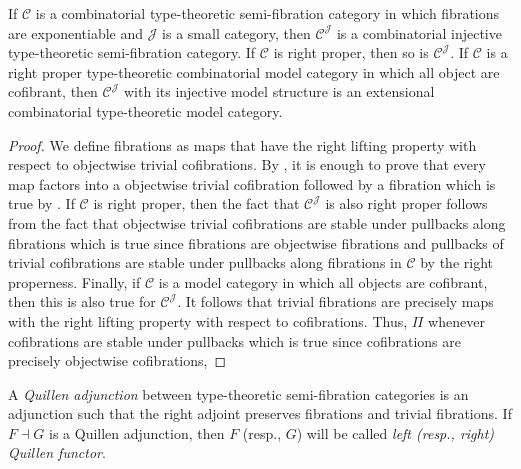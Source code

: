 \documentclass[reqno]{amsart}
\theoremstyle{definition}
\theoremstyle{remark}
\newcommand{\scat}[1]{\mathcal{#1}}
\numberwithin{figure}{section}
\begin{document}
\begin{cor}
If $\scat{C}$ is a combinatorial type-theoretic semi-fibration category in which fibrations are exponentiable and $\scat{J}$ is a small category, then $\scat{C}^\scat{J}$ is a combinatorial injective type-theoretic semi-fibration category.
If $\scat{C}$ is right proper, then so is $\scat{C}^\scat{J}$.
If $\scat{C}$ is a right proper type-theoretic combinatorial model category in which all object are cofibrant, then $\scat{C}^\scat{J}$ with its injective model structure is an extensional combinatorial type-theoretic model category.
\end{cor}
\begin{proof}
We define fibrations as maps that have the right lifting property with respect to objectwise trivial cofibrations.
By , it is enough to prove that every map factors into a objectwise trivial cofibration followed by a fibration which is true by \cite[Lemma~A.2.8.3]{lurie-topos}.
If $\scat{C}$ is right proper, then the fact that $\scat{C}^\scat{J}$ is also right proper follows from the fact that objectwise trivial cofibrations are stable under pullbacks along fibrations which is true since fibrations are objectwise fibrations and pullbacks of trivial cofibrations are stable under pullbacks along fibrations in $\scat{C}$ by the right properness.
Finally, if $\scat{C}$ is a model category in which all objects are cofibrant, then this is also true for $\scat{C}^\scat{J}$.
It follows that trivial fibrations are precisely maps with the right lifting property with respect to cofibrations.
Thus, $\Pi$ whenever cofibrations are stable under pullbacks which is true since cofibrations are precisely objectwise cofibrations,
\end{proof}

\begin{defn}
A \emph{Quillen adjunction} between type-theoretic semi-fibration categories is an adjunction such that the right adjoint preserves fibrations and trivial fibrations.
If $F \dashv G$ is a Quillen adjunction, then $F$ (resp., $G$) will be called \emph{left (resp., right) Quillen functor}.
\end{defn}
\end{document}
